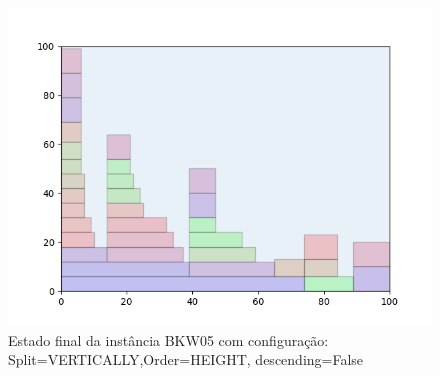 \begin{figure}[H]
    \centering
    \caption[]{Estado final da instância BKW05 com configuração: Split=VERTICALLY,Order=HEIGHT, descending=False}
    \label{fig:bkw05-vertically-height-false}
    \includegraphics[scale=0.5]{output/figures/bkw/bkw05/vertically/height/false/00}
\end{figure}